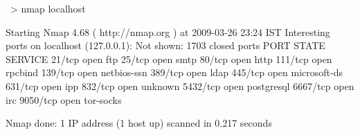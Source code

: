 ~> nmap localhost

Starting Nmap 4.68 ( http://nmap.org ) at 2009-03-26 23:24 IST
Interesting ports on localhost (127.0.0.1):
Not shown: 1703 closed ports
PORT     STATE SERVICE
21/tcp   open  ftp
25/tcp   open  smtp
80/tcp   open  http
111/tcp  open  rpcbind
139/tcp  open  netbios-ssn
389/tcp  open  ldap
445/tcp  open  microsoft-ds
631/tcp  open  ipp
832/tcp  open  unknown
5432/tcp open  postgresql
6667/tcp open  irc
9050/tcp open  tor-socks

Nmap done: 1 IP address (1 host up) scanned in 0.217 seconds
